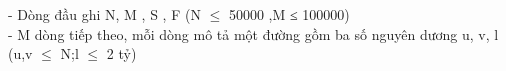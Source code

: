 - Dòng đầu ghi N, M , S , F (N $\le$  50000 ,M ≤ 100000)   
\\   - M dòng tiếp theo, mỗi dòng mô tả một đường gồm ba số nguyên dương u, v, l (u,v $\le$ N;l $\le$ 2 tỷ)